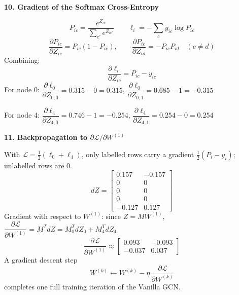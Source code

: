 \documentclass[12pt,a4paper]{article}
\newcommand{\h}[1]{\par\medskip\textbf{\large #1}\par}
\begin{document}
\h{10. Gradient of the Softmax Cross-Entropy}
\[
  P_{ic} = \frac{e^{Z_{ic}}}{\sum_{c'} e^{Z_{ic'}}} \qquad \ell_i = -\sum_c y_{ic}\log P_{ic}
\]
\[
  \frac{\partial P_{ic}}{\partial Z_{ic}} = P_{ic}(1 - P_{ic}), \qquad \frac{\partial P_{ic}}{\partial Z_{id}} = -P_{ic}P_{id} \quad (c \ne d)
\]
Combining:
\[
  \frac{\partial \ell_i}{\partial Z_{ic}} = P_{ic} - y_{ic}
\]
For node 0: \quad $\dfrac{\partial \ell_0}{\partial Z_{0,0}} = 0.315 - 0 = 0.315$, \qquad $\dfrac{\partial \ell_0}{\partial Z_{0,1}} = 0.685 - 1 = -0.315$

For node 4: \quad $\dfrac{\partial \ell_4}{\partial Z_{4,0}} = 0.746 - 1 = -0.254$, \qquad $\dfrac{\partial \ell_4}{\partial Z_{4,1}} = 0.254 - 0 = 0.254$

\h{11. Backpropagation to $\partial\mathcal L / \partial W^{(1)}$}
With $\mathcal L = \frac12(\ell_0 + \ell_4)$, only labelled rows carry a gradient $\frac12(P_i - y_i)$; unlabelled rows are 0.
\[
  dZ = \begin{bmatrix}
  0.157 & -0.157\\ 0&0\\ 0&0\\ 0&0\\ -0.127 & 0.127
  \end{bmatrix}
\]
Gradient with respect to $W^{(1)}$: since $Z = MW^{(1)}$, \ $\dfrac{\partial\mathcal L}{\partial W^{(1)}} = M^T dZ = M_0^T dZ_0 + M_4^T dZ_4$
\[
  \frac{\partial\mathcal L}{\partial W^{(1)}} \approx \begin{bmatrix} 0.093 & -0.093\\ -0.037 & 0.037 \end{bmatrix}
\]
A gradient descent step
\[
  W^{(k)} \leftarrow W^{(k)} - \eta\,\frac{\partial\mathcal L}{\partial W^{(k)}}
\]
completes one full training iteration of the Vanilla GCN.
\end{document}
